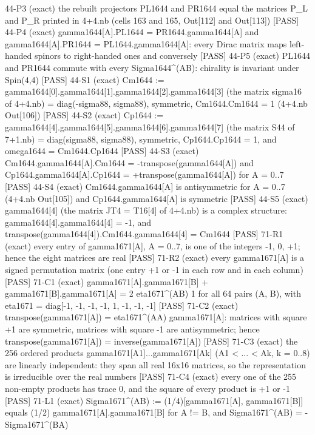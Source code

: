 \documentclass[
  10pt,
]{article}
\newenvironment{Shaded}{}{}
\newcommand{\NormalTok}[1]{#1}
\begin{document}
\begin{Shaded}
\begin{Highlighting}[]
\NormalTok{[PASS] 44{-}P3  (exact) the rebuilt projectors PL1644 and PR1644 equal the matrices P\_L and P\_R printed in 4+4.nb (cells 163 and 165, Out[112] and Out[113])}
\NormalTok{[PASS] 44{-}P4  (exact) gamma1644[A].PL1644 = PR1644.gamma1644[A] and gamma1644[A].PR1644 = PL1644.gamma1644[A]: every Dirac matrix maps left{-}handed spinors to right{-}handed ones and conversely}
\NormalTok{[PASS] 44{-}P5  (exact) PL1644 and PR1644 commute with every Sigma1644\^{}(AB): chirality is invariant under Spin(4,4)}
\NormalTok{[PASS] 44{-}S1  (exact) Cm1644 := gamma1644[0].gamma1644[1].gamma1644[2].gamma1644[3] (the matrix sigma16 of 4+4.nb) = diag({-}sigma88, sigma88), symmetric, Cm1644.Cm1644 = 1 (4+4.nb Out[106])}
\NormalTok{[PASS] 44{-}S2  (exact) Cp1644 := gamma1644[4].gamma1644[5].gamma1644[6].gamma1644[7] (the matrix S44 of 7+1.nb) = diag(sigma88, sigma88), symmetric, Cp1644.Cp1644 = 1, and omega1644 = Cm1644.Cp1644}
\NormalTok{[PASS] 44{-}S3  (exact) Cm1644.gamma1644[A].Cm1644 = {-}transpose(gamma1644[A]) and Cp1644.gamma1644[A].Cp1644 = +transpose(gamma1644[A]) for A = 0..7}
\NormalTok{[PASS] 44{-}S4  (exact) Cm1644.gamma1644[A] is antisymmetric for A = 0..7 (4+4.nb Out[105]) and Cp1644.gamma1644[A] is symmetric}
\NormalTok{[PASS] 44{-}S5  (exact) gamma1644[4] (the matrix JT4 = T16[4] of 4+4.nb) is a complex structure: gamma1644[4].gamma1644[4] = {-}1, and transpose(gamma1644[4]).Cm1644.gamma1644[4] = Cm1644}
\NormalTok{[PASS] 71{-}R1  (exact) every entry of gamma1671[A], A = 0..7, is one of the integers {-}1, 0, +1; hence the eight matrices are real}
\NormalTok{[PASS] 71{-}R2  (exact) every gamma1671[A] is a signed permutation matrix (one entry +1 or {-}1 in each row and in each column)}
\NormalTok{[PASS] 71{-}C1  (exact) gamma1671[A].gamma1671[B] + gamma1671[B].gamma1671[A] = 2 eta1671\^{}(AB) 1 for all 64 pairs (A, B), with eta1671 = diag[{-}1, {-}1, {-}1, {-}1, 1, {-}1, {-}1, {-}1]}
\NormalTok{[PASS] 71{-}C2  (exact) transpose(gamma1671[A]) = eta1671\^{}(AA) gamma1671[A]: matrices with square +1 are symmetric, matrices with square {-}1 are antisymmetric; hence transpose(gamma1671[A]) = inverse(gamma1671[A])}
\NormalTok{[PASS] 71{-}C3  (exact) the 256 ordered products gamma1671[A1]...gamma1671[Ak] (A1 \textless{} ... \textless{} Ak, k = 0..8) are linearly independent: they span all real 16x16 matrices, so the representation is irreducible over the real numbers}
\NormalTok{[PASS] 71{-}C4  (exact) every one of the 255 non{-}empty products has trace 0, and the square of every product is +1 or {-}1}
\NormalTok{[PASS] 71{-}L1  (exact) Sigma1671\^{}(AB) := (1/4)[gamma1671[A], gamma1671[B]] equals (1/2) gamma1671[A].gamma1671[B] for A != B, and Sigma1671\^{}(AB) = {-}Sigma1671\^{}(BA)}

\end{Highlighting}
\end{Shaded}
\end{document}
